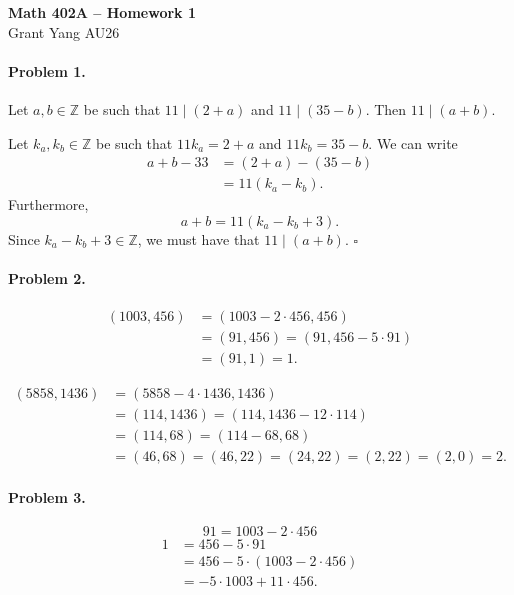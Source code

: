 \documentclass[12pt]{article}
\begin{document}
\begin{center} {\large \textbf{Math 402A -- Homework 1}} \smallskip \\ 
    Grant Yang \hspace{1em} AU26
 \end{center}

\paragraph{Problem 1.}
Let $a,b \in \mathbb Z$ be such that $11 \mid (2 + a)$ and $11 \mid (35 - b)$. Then $11 \mid (a + b)$.

Let $k_a,k_b \in \mathbb Z$ be such that $11 k_a = 2+a$ and $11 k_b = 35-b$. We can write
\begin{align*} a + b - 33 &= (2 + a) - (35 - b) \\ &= 11(k_a - k_b). \end{align*}
Furthermore,
\[ a + b = 11 (k_a - k_b + 3).\]
Since $k_a - k_b + 3 \in \mathbb Z$, we must have that $11 \mid (a+b)$. $\square$


\paragraph{Problem 2.}
\begin{align*}
    (1003,456) &= (1003-2\cdot 456, 456)  \\ 
    &= (91, 456) = (91, 456 - 5\cdot 91) \\
    &= (91, 1) = \boxed{1}.
\end{align*}

\begin{align*}
    (5858, 1436) &= (5858 - 4\cdot 1436, 1436) \\
    &= (114, 1436) = (114, 1436 - 12 \cdot 114) \\
    &= (114, 68) = (114 - 68, 68) \\
    &= (46, 68) = (46, 22) = (24,22) = (2, 22) = (2, 0) = \boxed{2}.
\end{align*}

\paragraph{Problem 3.}
\[91 = 1003 - 2\cdot 456\]
\begin{align*}
    1 &= 456 - 5 \cdot 91 \\
     &= 456 - 5 \cdot (1003 - 2 \cdot 456) \\
     &= \boxed{-5 \cdot 1003 + 11 \cdot 456}.
\end{align*}
\end{document}
